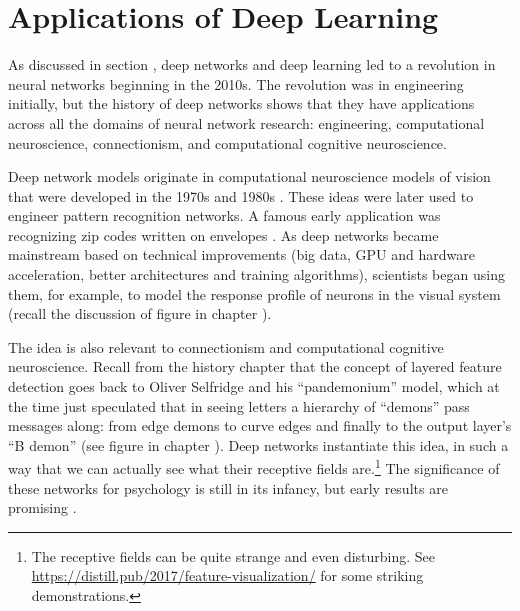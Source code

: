 \section{Applications of Deep Learning}

 
As discussed in section , deep networks and deep learning led to a revolution in neural networks beginning in the 2010s. The revolution was in engineering initially, but the history of deep networks shows that they have applications across all the domains of neural network research: engineering, computational neuroscience, connectionism, and computational cognitive neuroscience. 

Deep network models originate in  computational neuroscience models of vision that were developed in the 1970s and 1980s \cite{fukushima1982neocognitron}.  These ideas were later used to engineer pattern recognition networks. A famous early application was recognizing zip codes written on envelopes \cite{lecun1989backpropagation}. As deep networks became mainstream based on technical improvements (big data, GPU and hardware acceleration, better architectures and training algorithms), scientists began using them, for example, to model the response profile of neurons in the visual system (recall the discussion of figure  in chapter ). 

The idea is also relevant to connectionism and computational cognitive neuroscience. Recall from the history chapter that the concept of layered feature detection goes back to Oliver Selfridge and his ``pandemonium'' model, which at the time just speculated that in seeing letters a hierarchy of ``demons'' pass messages along: from edge demons to curve edges and finally to the output layer's ``B demon'' (see figure  in chapter ). Deep networks instantiate this idea, in such a way that we can actually  see what their receptive fields are.\footnote{The receptive fields can be quite strange and even disturbing. See \url{https://distill.pub/2017/feature-visualization/} for some striking demonstrations.}  The significance of these networks for psychology is still in its infancy, but early results are promising \cite{zorzi2013modeling, ritter2017cognitive}.
